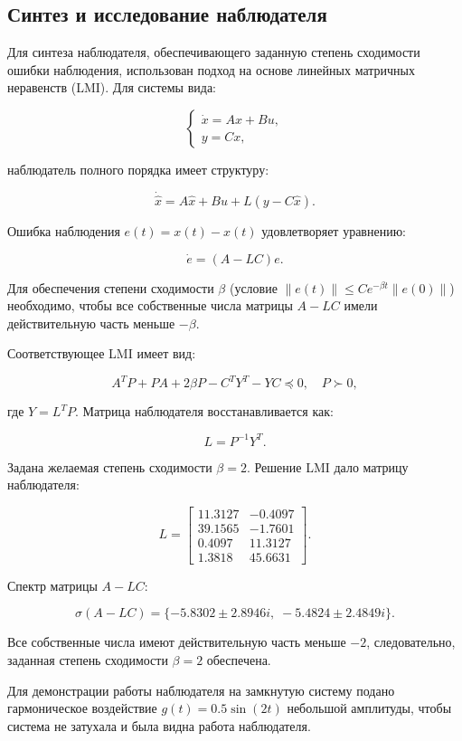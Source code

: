 \documentclass[a4paper,12pt]{article}
\begin{document}
	
\subsection{Синтез и исследование наблюдателя}

Для синтеза наблюдателя, обеспечивающего заданную степень сходимости ошибки наблюдения, использован подход на основе линейных матричных неравенств (LMI). Для системы вида:

\[
\begin{cases}
	\dot{x} = Ax + Bu, \\
	y = Cx,
\end{cases}
\]

наблюдатель полного порядка имеет структуру:

\[
\dot{\hat{x}} = A\hat{x} + Bu + L(y - C\hat{x}).
\]

Ошибка наблюдения \(e(t) = x(t) - \hat{x}(t)\) удовлетворяет уравнению:

\[
\dot{e} = (A - LC)e.
\]

Для обеспечения степени сходимости \(\beta\) (условие \(\|e(t)\| \leq C e^{-\beta t}\|e(0)\|\)) необходимо, чтобы все собственные числа матрицы \(A - LC\) имели действительную часть меньше \(-\beta\).

Соответствующее LMI имеет вид:

\[
A^T P + P A + 2\beta P - C^T Y^T - Y C \preceq 0, \quad P \succ 0,
\]

где \(Y = L^T P\). Матрица наблюдателя восстанавливается как:

\[
L = P^{-1}Y^T.
\]

Задана желаемая степень сходимости \(\beta = 2\). Решение LMI дало матрицу наблюдателя:

\[
L =
\begin{bmatrix}
	11.3127 & -0.4097 \\
	39.1565 & -1.7601 \\
	0.4097 & 11.3127 \\
	1.3818 & 45.6631
\end{bmatrix}.
\]

Спектр матрицы \(A - LC\):

\[
\sigma(A - LC) = \{-5.8302 \pm 2.8946i,\; -5.4824 \pm 2.4849i\}.
\]

Все собственные числа имеют действительную часть меньше \(-2\), следовательно, заданная степень сходимости \(\beta = 2\) обеспечена.

Для демонстрации работы наблюдателя на замкнутую систему подано гармоническое воздействие \(g(t) = 0.5\sin(2t)\) небольшой амплитуды, чтобы система не затухала и была видна работа наблюдателя.
\end{document}
